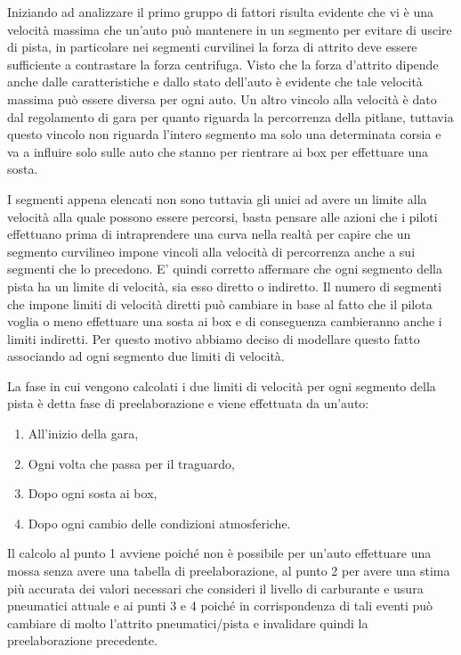 \documentclass[11pt,a4paper]{report}
\begin{document}
Iniziando ad analizzare il primo gruppo di fattori risulta evidente che vi è una velocità massima che un'auto può mantenere in un segmento per evitare di uscire di pista, in particolare nei segmenti curvilinei la forza di attrito deve essere sufficiente a contrastare la forza centrifuga.
Visto che la forza d'attrito dipende anche dalle caratteristiche e dallo stato dell'auto è evidente che tale velocità massima può essere diversa per ogni auto.
Un altro vincolo alla velocità è dato dal regolamento di gara per quanto riguarda la percorrenza della pitlane, tuttavia questo vincolo non riguarda l'intero segmento ma solo una determinata corsia e va a influire solo sulle auto che stanno per rientrare ai box per effettuare una sosta.

I segmenti appena elencati non sono tuttavia gli unici ad avere un limite alla velocità alla quale possono essere percorsi, basta pensare alle azioni che i piloti effettuano prima di intraprendere una curva nella realtà per capire che un segmento curvilineo impone vincoli alla velocità di percorrenza anche a sui segmenti che lo precedono. E' quindi corretto affermare che ogni segmento della pista ha un limite di velocità, sia esso diretto o indiretto. Il numero di segmenti che impone limiti di velocità diretti può cambiare in base al fatto che il pilota voglia o meno effettuare una sosta ai box e di conseguenza cambieranno anche i limiti indiretti. Per questo motivo abbiamo deciso di modellare questo fatto associando ad ogni segmento due limiti di velocità.

La fase in cui vengono calcolati i due limiti di velocità per ogni segmento della pista è detta fase di preelaborazione e viene effettuata da un'auto:
\begin{enumerate}
\item All'inizio della gara,
\item Ogni volta che passa per il traguardo,
\item Dopo ogni sosta ai box,
\item Dopo ogni cambio delle condizioni atmosferiche.
\end{enumerate}
Il calcolo al punto 1 avviene poiché non è possibile per un'auto effettuare una mossa senza avere una tabella di preelaborazione, al punto 2 per avere una stima più accurata dei valori necessari che consideri il livello di carburante e usura pneumatici attuale e ai punti 3 e 4 poiché in corrispondenza di tali eventi può cambiare di molto l'attrito pneumatici/pista e invalidare quindi la preelaborazione precedente.
\end{document}
